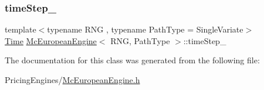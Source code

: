 \subsubsection{\texorpdfstring{time\+Step\+\_\+}{timeStep\_}}
{\footnotesize\ttfamily template$<$typename R\+NG , typename Path\+Type  = Single\+Variate$>$ \\
\hyperlink{_name_def_8h_ac2d3e0ba793497bcca555c7c2cf64ff3}{Time} \hyperlink{class_mc_european_engine}{Mc\+European\+Engine}$<$ R\+NG, Path\+Type $>$\+::time\+Step\+\_\+\hspace{0.3cm}{\ttfamily [private]}}



The documentation for this class was generated from the following file\+:\begin{DoxyCompactItemize}
\item 
Pricing\+Engines/\hyperlink{_mc_european_engine_8h}{Mc\+European\+Engine.\+h}\end{DoxyCompactItemize}

